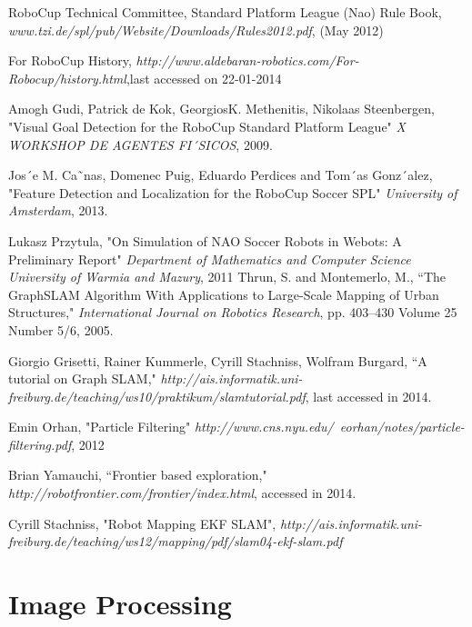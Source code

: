 \documentclass{ba-kecs}
\numberwithin{figure}{section}
\numberwithin{equation}{section}
\begin{document}
\begin{thebibliography}{99}

 RoboCup Technical Committee, Standard Platform League (Nao) Rule Book, \emph{www.tzi.de/spl/pub/Website/Downloads/Rules2012.pdf}, (May 2012)

 For RoboCup History, \emph{http://www.aldebaran-robotics.com/For-Robocup/history.html},last accessed on 22-01-2014

 Amogh Gudi, Patrick de Kok, GeorgiosK. Methenitis, Nikolaas Steenbergen, "Visual Goal Detection for the RoboCup Standard Platform League" \emph{X WORKSHOP DE AGENTES FI´SICOS}, 2009.

 Jos´e M. Ca˜nas, Domenec Puig, Eduardo Perdices and Tom´as Gonz´alez, "Feature Detection and Localization for the
RoboCup Soccer SPL" \emph{University of Amsterdam}, 2013.

 Lukasz Przytula, "On Simulation of NAO Soccer Robots in Webots: A Preliminary Report" \emph{Department of Mathematics and Computer Science University of Warmia and Mazury}, 2011
 Thrun, S. and Montemerlo, M., ``The GraphSLAM Algorithm With Applications to Large-Scale Mapping of Urban Structures," \emph{International Journal on Robotics Research}, pp. 403--430 Volume 25 Number 5/6, 2005.

 Giorgio Grisetti, Rainer Kummerle, Cyrill Stachniss, Wolfram Burgard, ``A tutorial on Graph SLAM," \emph{http://ais.informatik.uni-freiburg.de/teaching/ws10/praktikum/slamtutorial.pdf}, last accessed in 2014.

 Emin Orhan, "Particle Filtering" \emph{http://www.cns.nyu.edu/~eorhan/notes/particle-filtering.pdf}, 2012
 
 Brian Yamauchi, ``Frontier based exploration," \emph{http://robotfrontier.com/frontier/index.html}, accessed in 2014. 

 Cyrill Stachniss, "Robot Mapping EKF SLAM", \emph{http://ais.informatik.uni-freiburg.de/teaching/ws12/mapping/pdf/slam04-ekf-slam.pdf }


\end{thebibliography}

\appendix
\section{Image Processing}
\end{document}
